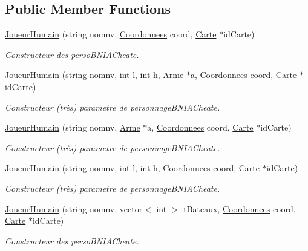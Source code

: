\subsection*{Public Member Functions}
\begin{DoxyCompactItemize}
\item 
\hyperlink{classJoueurHumain_a28fc9a25bbd04a3126940898e7caa068}{Joueur\-Humain} (string nomnv, \hyperlink{classCoordonnees}{Coordonnees} coord, \hyperlink{classCarte}{Carte} $\ast$id\-Carte)
\begin{DoxyCompactList}\small\item\em Constructeur des perso\-B\-N\-I\-A\-Cheate. \end{DoxyCompactList}\item 
\hyperlink{classJoueurHumain_a6c7cda10e16fcfdfa613fe069b005d29}{Joueur\-Humain} (string nomnv, int l, int h, \hyperlink{classArme}{Arme} $\ast$a, \hyperlink{classCoordonnees}{Coordonnees} coord, \hyperlink{classCarte}{Carte} $\ast$id\-Carte)
\begin{DoxyCompactList}\small\item\em Constructeur (très) parametre de personnage\-B\-N\-I\-A\-Cheate. \end{DoxyCompactList}\item 
\hyperlink{classJoueurHumain_a2dbf1390b2f6d45377fdd40eaea6c9c3}{Joueur\-Humain} (string nomnv, \hyperlink{classArme}{Arme} $\ast$a, \hyperlink{classCoordonnees}{Coordonnees} coord, \hyperlink{classCarte}{Carte} $\ast$id\-Carte)
\begin{DoxyCompactList}\small\item\em Constructeur (très) parametre de personnage\-B\-N\-I\-A\-Cheate. \end{DoxyCompactList}\item 
\hyperlink{classJoueurHumain_adc6ce23d4235296e6ff795ec0d7a7f34}{Joueur\-Humain} (string nomnv, int l, int h, \hyperlink{classCoordonnees}{Coordonnees} coord, \hyperlink{classCarte}{Carte} $\ast$id\-Carte)
\begin{DoxyCompactList}\small\item\em Constructeur (très) parametre de personnage\-B\-N\-I\-A\-Cheate. \end{DoxyCompactList}\item 
\hyperlink{classJoueurHumain_a48879a6505888acf397787792ea3a2fb}{Joueur\-Humain} (string nomnv, vector$<$ int $>$ t\-Bateaux, \hyperlink{classCoordonnees}{Coordonnees} coord, \hyperlink{classCarte}{Carte} $\ast$id\-Carte)
\begin{DoxyCompactList}\small\item\em Constructeur des perso\-B\-N\-I\-A\-Cheate. \end{DoxyCompactList}\item 

\end{DoxyCompactItemize}
